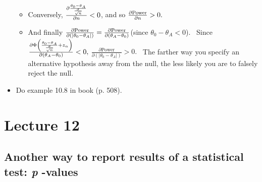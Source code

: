 \documentclass[11pt]{article}
\begin{document}
\begin{itemize}
\begin{itemize}
\item Conversely, $\frac{\partial \frac{\theta _{0}-\theta _{A}}{\frac{%
\sigma }{\sqrt{n}}}}{\partial n}<0$, and so $\frac{\partial \text{Power}}{%
\partial n}>0.$

\item And finally $\frac{\partial \text{Power}}{\partial \left( \left\vert
\theta _{0}-\theta _{A}\right\vert \right) }=\frac{\partial \text{Power}}{%
\partial \left( \theta _{A}-\theta _{0}\right) }$(since $\theta _{0}-\theta
_{A}<0$). \ Since $\frac{\partial \Phi \left( \frac{\theta _{0}-\theta _{A}}{%
\frac{\sigma }{\sqrt{n}}}+z_{\alpha }\right) }{\partial \left( \theta
_{A}-\theta _{0}\right) }<0,$ $\frac{\partial \text{Power}}{\partial \left(
\left\vert \theta _{0}-\theta _{A}\right\vert \right) }>0.$ \ The farther
way you specify an alternative hypothesis away from the null, the less
likely you are to falsely reject the null.
\end{itemize}

\item Do example 10.8 in book (p. 508).
\end{itemize}

\section{Lecture 12}

\subsection{Another way to report results of a statistical test: \textit{p}%
-values}
\end{document}
